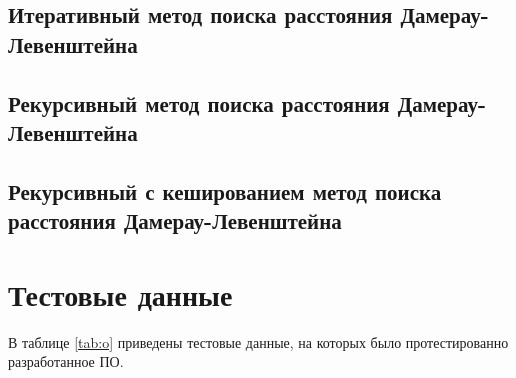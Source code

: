 \subsection{Итеративный метод поиска расстояния Дамерау-Левенштейна}


\subsection{Рекурсивный метод поиска расстояния Дамерау-Левенштейна}


\subsection{Рекурсивный с кешированием метод поиска расстояния Дамерау-Левенштейна}


\section{Тестовые данные}

В таблице \ref{tab:o} приведены тестовые данные, на которых было протестированно разработанное ПО.

